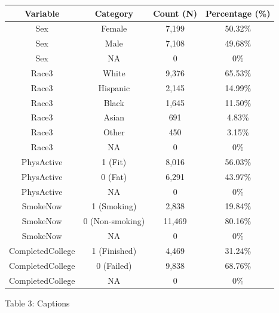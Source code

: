\documentclass{article}
\begin{document}
\begin{center}
    \small
    \begin{tabular}{|c|c|c|c|}
        \hline
        Variable & Category & Count (N) & Percentage (\%) \\
        \hline
        Sex & Female & 7,199 & 50.32\% \\
        \hline
        Sex & Male & 7,108 & 49.68\% \\
        \hline
        Sex & NA & 0 & 0\% \\
        \hline
        Race3 & White & 9,376 & 65.53\% \\
        \hline
        Race3 & Hispanic & 2,145 & 14.99\% \\
        \hline
        Race3 & Black & 1,645 & 11.50\% \\
        \hline
        Race3 & Asian & 691 & 4.83\% \\
        \hline
        Race3 & Other & 450 & 3.15\% \\
        \hline 
        Race3 & NA & 0 & 0\% \\
        \hline
        PhysActive & 1 (Fit) & 8,016 & 56.03\% \\
        \hline
        PhysActive & 0 (Fat) & 6,291 & 43.97\% \\
        \hline
        PhysActive & NA & 0 & 0\% \\
        \hline
        SmokeNow & 1 (Smoking) & 2,838 & 19.84\% \\
        \hline
        SmokeNow & 0 (Non-smoking) & 11,469 & 80.16\% \\
        \hline
        SmokeNow & NA & 0 & 0\% \\
        \hline
        CompletedCollege & 1 (Finished) & 4,469 & 31.24\% \\
        \hline
        CompletedCollege & 0 (Failed) & 9,838 & 68.76\% \\
        \hline
        CompletedCollege & NA & 0 & 0\% \\
        \hline
    \end{tabular}
\end{center}
\bigskip
{\Large Table 3: Captions}
\end{document}
